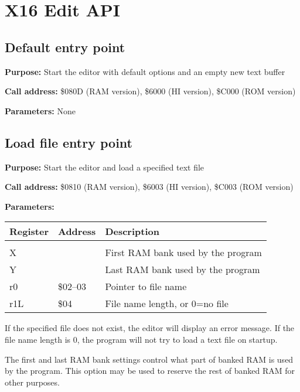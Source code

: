 \documentclass{article}
\begin{document}
\newpage
\section{X16 Edit API}

    \subsection{Default entry point}

        \textbf{Purpose:} Start the editor with default options and an empty new text buffer

        \textbf{Call address:} \$080D (RAM version), \$6000 (HI version), \$C000 (ROM version)
    
        \textbf{Parameters:} None

    \subsection{Load file entry point}
        
        \textbf{Purpose:} Start the editor and load a specified text file

        \textbf{Call address:} \$0810 (RAM version), \$6003 (HI version), \$C003 (ROM version)

        \textbf{Parameters:} 

        \begin{longtable}[l]{l l l}
            \textbf{Register} & \textbf{Address} & \textbf{Description} \\
	        \hline \\
            X   &          & First RAM bank used by the program \\
            Y   &          & Last RAM bank used by the program \\
            r0  & \$02--03 & Pointer to file name \\
            r1L & \$04     & File name length, or 0=no file \\
        \end{longtable}

        If the specified file does not exist, the editor will display an
        error message. If the file name length is 0, the program will not try
        to load a text file on startup.

        The first and last RAM bank settings control what part of banked RAM is
        used by the program. This option may be used to reserve the rest of banked RAM
        for other purposes.
\end{document}
